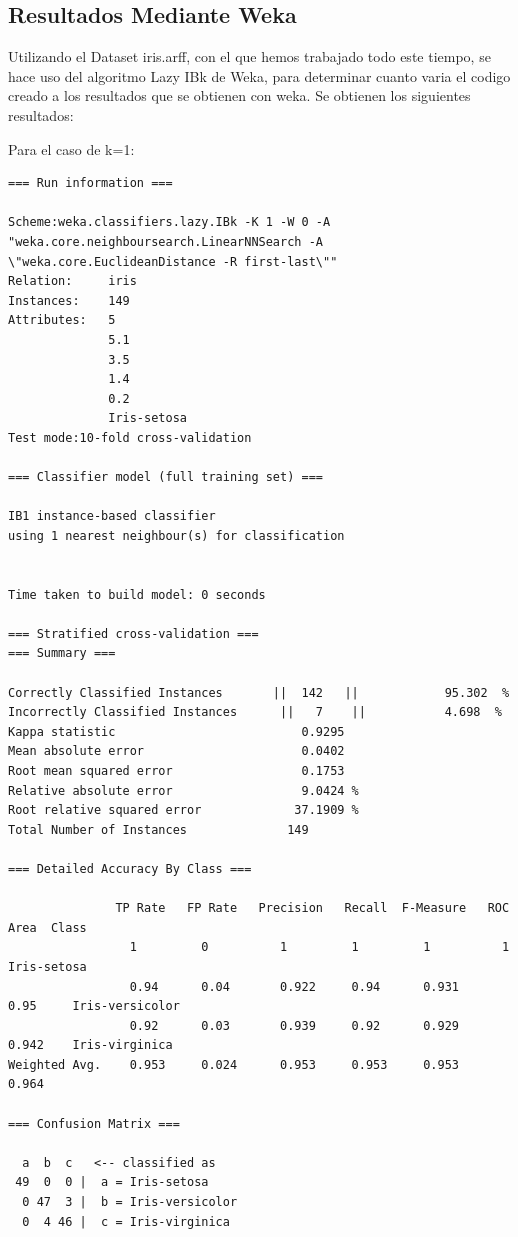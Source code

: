 \documentclass[12pt,letterpaper]{article}
\begin{document}
\subsection{Resultados Mediante Weka}

Utilizando el Dataset iris.arff, con el que hemos trabajado todo este tiempo, se hace uso del algoritmo Lazy IBk de Weka, para determinar cuanto varia el codigo creado a los resultados que se obtienen con weka. Se obtienen los siguientes resultados:


Para el caso de k=1:
\begin{lstlisting}
=== Run information ===

Scheme:weka.classifiers.lazy.IBk -K 1 -W 0 -A "weka.core.neighboursearch.LinearNNSearch -A \"weka.core.EuclideanDistance -R first-last\""
Relation:     iris
Instances:    149
Attributes:   5
              5.1
              3.5
              1.4
              0.2
              Iris-setosa
Test mode:10-fold cross-validation

=== Classifier model (full training set) ===

IB1 instance-based classifier
using 1 nearest neighbour(s) for classification


Time taken to build model: 0 seconds

=== Stratified cross-validation ===
=== Summary ===

Correctly Classified Instances       ||  142   ||            95.302  %
Incorrectly Classified Instances      ||   7    ||           4.698  %
Kappa statistic                          0.9295
Mean absolute error                      0.0402
Root mean squared error                  0.1753
Relative absolute error                  9.0424 %
Root relative squared error             37.1909 %
Total Number of Instances              149     

=== Detailed Accuracy By Class ===

               TP Rate   FP Rate   Precision   Recall  F-Measure   ROC Area  Class
                 1         0          1         1         1          1        Iris-setosa
                 0.94      0.04       0.922     0.94      0.931      0.95     Iris-versicolor
                 0.92      0.03       0.939     0.92      0.929      0.942    Iris-virginica
Weighted Avg.    0.953     0.024      0.953     0.953     0.953      0.964

=== Confusion Matrix ===

  a  b  c   <-- classified as
 49  0  0 |  a = Iris-setosa
  0 47  3 |  b = Iris-versicolor
  0  4 46 |  c = Iris-virginica
\end{lstlisting}
\end{document}
